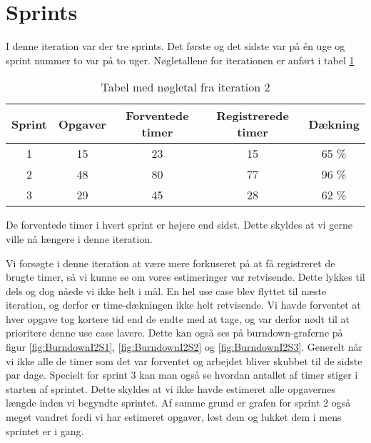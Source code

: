 \section{Sprints}

I denne iteration var der tre sprints. Det første og det sidste var på én uge og sprint nummer to var på to uger.
Nøgletallene for iterationen er anført i tabel \ref{table:iteration2sprints}

\begin{table}
\centering
\begin{tabular}{|c|c|c|c|c|}
\hline 
\textbf{Sprint} 	& \textbf{Opgaver} 	& \textbf{Forventede timer} 	& \textbf{Registrerede timer} 	& \textbf{Dækning} \\ 
\hline
1 		& 15 		& 23 				& 15						& 65 \% \\ 
\hline 
2 		& 48 		& 80 				& 77						& 96 \% \\ 
\hline 
3 		& 29 		& 45 				& 28						& 62 \% \\ 
\hline 
\end{tabular}
\caption{Tabel med nøgletal fra iteration 2}
\label{table:iteration2sprints}
\end{table}

De forventede timer i hvert sprint er højere end sidst. Dette skyldes at vi gerne ville nå længere i denne iteration.

Vi forsøgte i denne iteration at være mere forkuseret på at få registreret de brugte timer, så vi kunne se om vores estimeringer var retvisende. Dette lykkes til dels og dog nåede vi ikke helt i mål. En hel use case blev flyttet til næste iteration, og derfor er time-dækningen ikke helt retvisende. Vi havde forventet at hver opgave tog kortere tid end de endte med at tage, og var derfor nødt til at prioritere denne use case lavere. Dette kan også ses på burndown-graferne på figur \ref{fig:BurndownI2S1}, \ref{fig:BurndownI2S2} og \ref{fig:BurndownI2S3}. Generelt når vi ikke alle de timer som det var forventet og arbejdet bliver skubbet til de sidste par dage.
Specielt for sprint 3 kan man også se hvordan antallet af timer stiger i starten af sprintet. Dette skyldes at vi ikke havde estimeret alle opgavernes længde inden vi begyndte sprintet. Af samme grund er grafen for sprint 2 også meget vandret fordi vi har estimeret opgaver, løst dem og lukket dem i mens sprintet er i gang.

\begin{minipage}{0.5\textwidth}
\end{minipage}
\begin{minipage}{0.5\textwidth}
\end{minipage}
